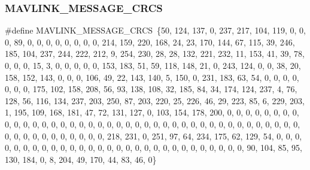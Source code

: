 \mbox{\label{_a_s_l_u_a_v_8h_a3f709d5835acb54a11202a5fdc7a6bfe}} 
\subsubsection{M\+A\+V\+L\+I\+N\+K\+\_\+\+M\+E\+S\+S\+A\+G\+E\+\_\+\+C\+R\+CS}
{\footnotesize\ttfamily \#define M\+A\+V\+L\+I\+N\+K\+\_\+\+M\+E\+S\+S\+A\+G\+E\+\_\+\+C\+R\+CS~\{50, 124, 137, 0, 237, 217, 104, 119, 0, 0, 0, 89, 0, 0, 0, 0, 0, 0, 0, 0, 214, 159, 220, 168, 24, 23, 170, 144, 67, 115, 39, 246, 185, 104, 237, 244, 222, 212, 9, 254, 230, 28, 28, 132, 221, 232, 11, 153, 41, 39, 78, 0, 0, 0, 15, 3, 0, 0, 0, 0, 0, 153, 183, 51, 59, 118, 148, 21, 0, 243, 124, 0, 0, 38, 20, 158, 152, 143, 0, 0, 0, 106, 49, 22, 143, 140, 5, 150, 0, 231, 183, 63, 54, 0, 0, 0, 0, 0, 0, 0, 175, 102, 158, 208, 56, 93, 138, 108, 32, 185, 84, 34, 174, 124, 237, 4, 76, 128, 56, 116, 134, 237, 203, 250, 87, 203, 220, 25, 226, 46, 29, 223, 85, 6, 229, 203, 1, 195, 109, 168, 181, 47, 72, 131, 127, 0, 103, 154, 178, 200, 0, 0, 0, 0, 0, 0, 0, 0, 0, 0, 0, 0, 0, 0, 0, 0, 0, 0, 0, 0, 0, 0, 0, 0, 0, 0, 0, 0, 0, 0, 0, 0, 0, 0, 0, 0, 0, 0, 0, 0, 0, 0, 0, 0, 0, 0, 0, 0, 0, 0, 0, 218, 231, 0, 251, 97, 64, 234, 175, 62, 129, 54, 0, 0, 0, 0, 0, 0, 0, 0, 0, 0, 0, 0, 0, 0, 0, 0, 0, 0, 0, 0, 0, 0, 0, 0, 0, 0, 0, 0, 0, 90, 104, 85, 95, 130, 184, 0, 8, 204, 49, 170, 44, 83, 46, 0\}}

\mbox{\label{_a_s_l_u_a_v_8h_a384e37b2c133fdf33407436a982d2fb7}} 
